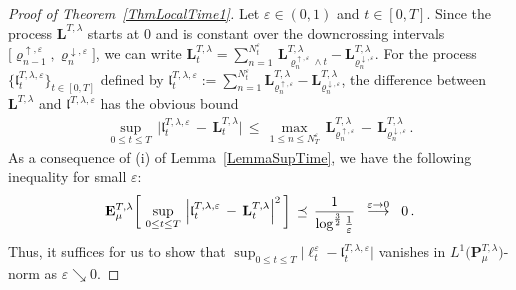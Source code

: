 \documentclass[10pt]{article}
\def\stackrel#1#2{\mathrel{\mathop{#2}\limits^{#1}}}
\numberwithin{equation}{section}
\theoremstyle{definition}
\begin{document}
\begin{proof}[Proof of Theorem~\ref{ThmLocalTime1}]
Let $\varepsilon \in (0,  1)$ and $t\in [0,T]$.  Since the process $ \mathbf{L}^{T,\lambda}$ starts at $0$ and is constant over the downcrossing intervals $\big[ \varrho_{n-1}^{\uparrow,\varepsilon}, \varrho_{n}^{\downarrow,\varepsilon}\big] $, we can write 
$\mathbf{L}_{t}^{T,\lambda}=\sum_{n=1}^{ N_{t}^{\varepsilon} }\, \mathbf{L}_{\varrho_{n}^{\uparrow,\varepsilon}\wedge t}^{T,\lambda}-\mathbf{L}_{\varrho_{n}^{\downarrow,\varepsilon}}^{T,\lambda}  $.
For the process $ \{\mathfrak{l}_{t}^{T,\lambda,\varepsilon}\}_{t\in [0,T]}$ defined by
$   \mathfrak{l}_{t}^{T,\lambda,\varepsilon}:=\sum_{n=1}^{ N_{t}^{\varepsilon} }\mathbf{L}_{\varrho_{n}^{\uparrow,\varepsilon}}^{T,\lambda}-\mathbf{L}_{\varrho_{n}^{\downarrow,\varepsilon}}^{T,\lambda}    
$, the difference between $\mathbf{L}^{T,\lambda }$ and $\mathfrak{l}^{T,\lambda,\varepsilon}$ has the obvious bound 
\begin{align*}
  \sup_{0\leq t\leq T} \,\Big|  \mathfrak{l}_{t}^{T,\lambda,\varepsilon}\,-\,\mathbf{L}_{t}^{T,\lambda }\Big|\,\leq \, \max_{1\leq n \leq N_T^{\varepsilon} }\,\mathbf{L}_{\varrho_{n}^{\uparrow,\varepsilon}}^{T,\lambda}\,-\,\mathbf{L}_{\varrho_{n}^{\downarrow,\varepsilon}}^{T,\lambda}   \,.
\end{align*}
As a consequence of (i) of Lemma~\ref{LemmaSupTime}, we have the following inequality for small  $\varepsilon$:
\begin{align*}
\mathbf{E}_{\mu}^{T,\lambda} \bigg[ \,\sup_{0\leq t\leq T} \,\Big|  \mathfrak{l}_{t}^{T,\lambda,\varepsilon}\,-\,\mathbf{L}_{t}^{T,\lambda}\Big|^2 \,\bigg]\,\preceq \, \frac{1}{\log^{\frac{3}{2}}\frac{1}{\varepsilon} }\hspace{.2cm}\stackrel{\varepsilon\rightarrow 0 }{\longrightarrow }  \hspace{.2cm}0 \,.
\end{align*}
Thus, it suffices for us to show that $ \sup_{0\leq t\leq T} \big|  \ell_{t}^{\varepsilon}-\mathfrak{l}_{t}^{T,\lambda,\varepsilon}\big|$ vanishes in $L^1\big(\mathbf{P}_{\mu}^{T,\lambda} \big)$-norm as $\varepsilon\searrow 0$. \vspace{.2cm}



\end{proof}
\end{document}
